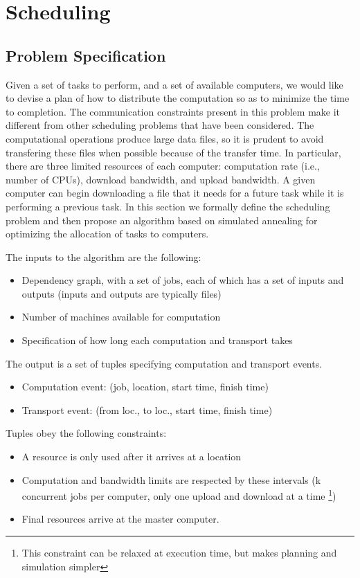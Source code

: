 \documentclass[letterpaper, 10 pt, conference]{ieeeconf}  %
\begin{document}
\section{Scheduling} \label{sec:scheduling}

\subsection{Problem Specification}

Given a set of tasks to perform, and a set of available computers, we would like to devise a plan of how to distribute the computation so as to minimize the time to completion.
The communication constraints present in this problem make it different from other scheduling problems that have been considered.
The computational operations produce large data files, so it is prudent to avoid transfering these files when possible because of the transfer time.
In particular, there are three limited resources of each computer: computation rate (i.e., number of CPUs), download bandwidth, and upload bandwidth.
A given computer can begin downloading a file that it needs for a future task while it is performing a previous task. 
In this section we formally define the scheduling problem and then propose an algorithm based on simulated annealing for optimizing the allocation of tasks to computers.

The inputs to the algorithm are the following:
\begin{itemize}
	\item Dependency graph, with a set of jobs, each of which has a set of inputs and outputs (inputs and outputs are typically files)
	\item Number of machines available for computation
	\item Specification of how long each computation and transport takes
\end{itemize}
The output is a set of tuples specifying computation and transport events.
\begin{itemize}
	\item Computation event: (job, location, start time, finish time)
	\item Transport event: (from loc., to loc., start time, finish time)
\end{itemize}
Tuples obey the following constraints:
\begin{itemize}
	\item A resource is only used after it arrives at a location
	\item Computation and bandwidth limits are respected by these intervals (k concurrent jobs per computer, only one upload and download at a time \footnote{This constraint can be relaxed at execution time, but makes planning and  simulation simpler})
	\item Final resources arrive at the master computer.
\end{itemize}
\end{document}
